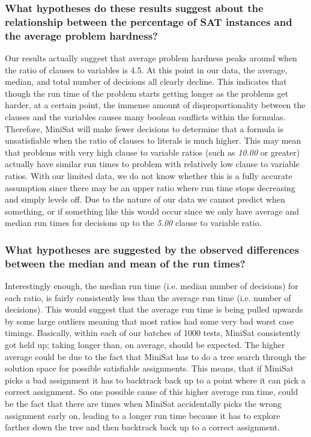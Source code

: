 \documentclass{eptcs}
\begin{document}
\subsubsection{What hypotheses do these results suggest about the relationship between the percentage of SAT instances and the average problem hardness?}
Our results actually suggest that average problem hardness peaks around when the ratio of clauses to variables is 4.5. At this point in our data, the average, median, and total number of decisions all clearly decline. This indicates that though the run time of the problem starts getting longer as the problems get harder, at a certain point, the immense amount of disproportionality between the clauses and the variables causes many boolean conflicts within the formulas. Therefore, MiniSat will make fewer decisions to determine that a formula is unsatisfiable when the ratio of clauses to literals is much higher. This may mean that problems with very high clause to variable ratios (such as \textit{10.00} or greater) actually have similar run times to problem with relatively low clause to variable ratios. With our limited data, we do not know whether this is a fully accurate assumption since there may be an upper ratio where run time stops decreasing and simply levels off. Due to the nature of our data we cannot predict when something, or if something like this would occur since we only have average and median run times for decisions up to the \textit{5.00} clause to variable ratio. 

\subsubsection{What hypotheses are suggested by the observed differences between the median and mean of the run times?}
Interestingly enough, the median run time (i.e. median number of decisions) for each ratio, is fairly consistently less than the average run time (i.e. number of decisions). This would suggest that the average run time is being pulled upwards by some large outliers meaning that most ratios had some very bad worst case timings. Basically, within each of our batches of 1000 tests, MiniSat consistently got held up; taking longer than, on average, should be expected. The higher average could be due to the fact that MiniSat has to do a tree search through the solution space for possible satisfiable assignments. This means, that if MiniSat picks a bad assignment it has to backtrack back up to a point where it can pick a correct assignment. So one possible cause of this higher average run time, could be the fact that there are times when MiniSat accidentally picks the wrong assignment early on, leading to a longer run time because it has to explore farther down the tree and then backtrack back up to a correct assignment.
\newpage


\end{document}
